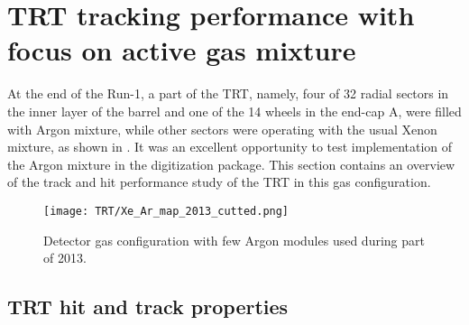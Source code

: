 \section{TRT tracking performance with focus on active gas mixture}
\label{sec:trt_tracking_perf}

At the end of the Run-1, a part of the TRT, namely,
four of 32 radial sectors in the inner layer of the barrel and one of the 14 wheels in the end-cap A, were filled with Argon mixture, while other sectors were operating 
with the usual Xenon mixture, as shown in .
It was an excellent opportunity to test implementation of the Argon mixture in the digitization package.
This section contains an overview of the track and hit performance study of the TRT in this gas configuration.

\begin{figure}
\begin{center}
 \texttt{[image: TRT/Xe\_Ar\_map\_2013\_cutted.png]}
\caption{Detector gas configuration with few Argon modules used during part of 2013.}
\label{fig:argonModulesIn2013}
\end{center}
\end{figure}

\subsection{TRT hit and track properties}

